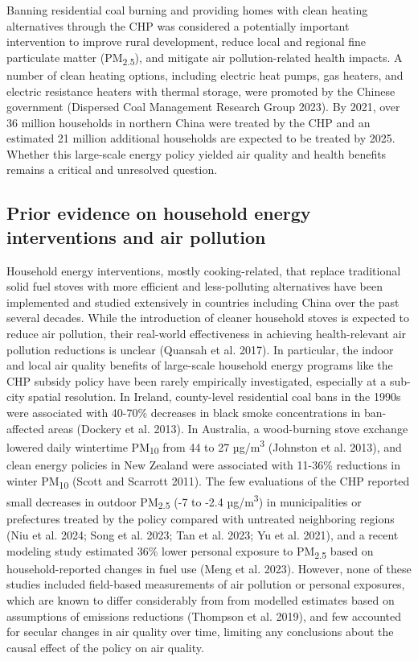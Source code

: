 \documentclass[
  letterpaper,
  DIV=11,
  numbers=noendperiod]{scrartcl}
\begin{document}
Banning residential coal burning and providing homes with clean heating
alternatives through the CHP was considered a potentially important
intervention to improve rural development, reduce local and regional
fine particulate matter (PM\textsubscript{2.5}), and mitigate air
pollution-related health impacts. A number of clean heating options,
including electric heat pumps, gas heaters, and electric resistance
heaters with thermal storage, were promoted by the Chinese government
(Dispersed Coal Management Research Group 2023). By 2021, over 36
million households in northern China were treated by the CHP and an
estimated 21 million additional households are expected to be treated by
2025. Whether this large-scale energy policy yielded air quality and
health benefits remains a critical and unresolved question.

\subsection{Prior evidence on household energy interventions and air
pollution}\label{prior-evidence-on-household-energy-interventions-and-air-pollution}

Household energy interventions, mostly cooking-related, that replace
traditional solid fuel stoves with more efficient and less-polluting
alternatives have been implemented and studied extensively in countries
including China over the past several decades. While the introduction of
cleaner household stoves is expected to reduce air pollution, their
real-world effectiveness in achieving health-relevant air pollution
reductions is unclear (Quansah et al. 2017). In particular, the indoor
and local air quality benefits of large-scale household energy programs
like the CHP subsidy policy have been rarely empirically investigated,
especially at a sub-city spatial resolution. In Ireland, county-level
residential coal bans in the 1990s were associated with 40-70\%
decreases in black smoke concentrations in ban-affected areas (Dockery
et al. 2013). In Australia, a wood-burning stove exchange lowered daily
wintertime PM\textsubscript{10} from 44 to 27 µg/m\textsuperscript{3}
(Johnston et al. 2013), and clean energy policies in New Zealand were
associated with 11-36\% reductions in winter PM\textsubscript{10} (Scott
and Scarrott 2011). The few evaluations of the CHP reported small
decreases in outdoor PM\textsubscript{2.5} (-7 to -2.4
µg/m\textsuperscript{3}) in municipalities or prefectures treated by the
policy compared with untreated neighboring regions (Niu et al. 2024;
Song et al. 2023; Tan et al. 2023; Yu et al. 2021), and a recent
modeling study estimated 36\% lower personal exposure to
PM\textsubscript{2.5} based on household-reported changes in fuel use
(Meng et al. 2023). However, none of these studies included field-based
measurements of air pollution or personal exposures, which are known to
differ considerably from from modelled estimates based on assumptions of
emissions reductions (Thompson et al. 2019), and few accounted for
secular changes in air quality over time, limiting any conclusions about
the causal effect of the policy on air quality.
\end{document}

